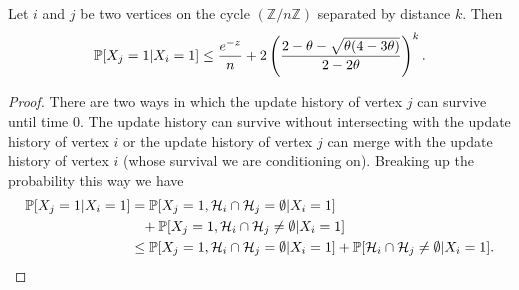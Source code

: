 	\begin{lemma}
		\label{lem:X_i+k given X_i}
		Let $i$ and $j$ be two vertices on the cycle $(\mathbb{Z}/n\mathbb{Z})$ separated by distance $k$. Then
		\begin{equation}
			\label{eq:prob X_i+k = 1|X_i = 1}
			\mathbb{P}[X_j = 1| X_i = 1] \leq \frac{e^{-z}}{n} + 2\left(\frac{2 - \theta - \sqrt{\theta(4 - 3\theta)}}{2 - 2\theta}\right)^k.
		\end{equation}
	\end{lemma}
	\begin{proof}
		There are two ways in which the update history of vertex $j$ can survive until time $0$. The update history can survive without intersecting with the update history of vertex $i$ or the update history of vertex $j$ can merge with the update history of vertex $i$ (whose survival we are conditioning on). %
		Breaking up the probability this way we have
		\begin{align}
			\prob[X_j = 1| X_i = 1] &= \prob[X_j = 1, \mathcal{H}_i \cap \mathcal{H}_j = \emptyset | X_i = 1] \notag\\
			&\phantom{=}+ \prob[X_j = 1, \mathcal{H}_i \cap \mathcal{H}_j \neq \emptyset | X_i = 1]\\
			&\leq \prob[X_j = 1, \mathcal{H}_i \cap \mathcal{H}_j = \emptyset | X_i = 1] %
			+ \prob[\mathcal{H}_i \cap \mathcal{H}_j \neq \emptyset | X_i = 1].
		\end{align}


\end{proof}
